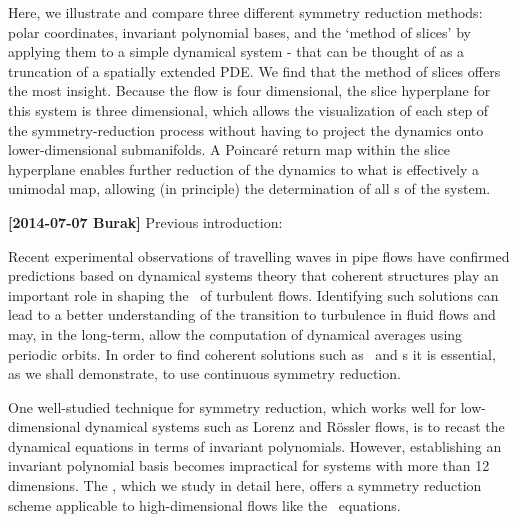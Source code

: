 Here, we illustrate and compare
three different symmetry reduction methods: polar coordinates, invariant
polynomial bases, and the `{method of slices}' by applying them to a
simple dynamical system
%
%
%
 - that can be thought of as a truncation of a spatially extended PDE. We find that the {method
of slices} offers the most insight.  Because the flow is four dimensional,
the slice hyperplane for this system is three dimensional, which allows
the visualization of each step of the symmetry-reduction process without having to
project the dynamics onto lower-dimensional submanifolds. A Poincar\'e return
map within the slice hyperplane enables further reduction of the dynamics to what is effectively a unimodal map, allowing (in principle) the determination of all {\rpo s} of the system.

{\bf[2014-07-07 Burak]} Previous introduction:

Recent experimental observations of travelling waves in pipe flows have confirmed predictions based on dynamical systems theory that coherent structures play an important role in shaping the \statesp\ of turbulent flows. Identifying such solutions can lead to a better
understanding of the transition to turbulence in fluid flows and may, in the long-term,
allow the computation of dynamical averages using periodic orbits. In order to
find coherent solutions such as \reqva\ and \rpo s it is essential, as we shall demonstrate,
to use continuous symmetry reduction.

One well-studied technique for symmetry reduction, which works well for low-dimensional dynamical systems such
as Lorenz and R\"{o}ssler flows, is to recast the dynamical equations in terms of invariant polynomials.
However, establishing an invariant polynomial basis becomes impractical
for systems with more than 12 dimensions.
The \mslices%
,
which we study in detail here, offers a symmetry reduction
scheme applicable to high-dimensional flows like the \NS\ equations.

